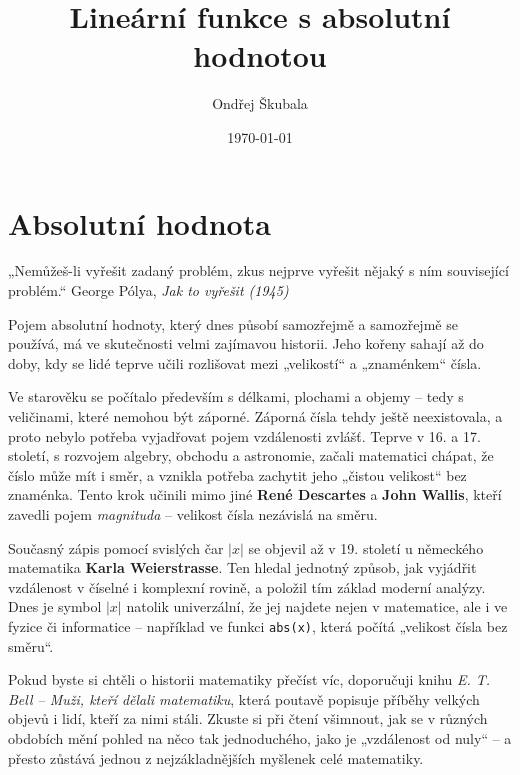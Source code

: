 \documentclass[12pt,a4paper]{article}
\title{Lineární funkce s absolutní hodnotou}
\author{Ondřej Škubala}
\date{\today}
\begin{document}
\maketitle
\newpage



\section{Absolutní hodnota}

\begin{quotebox}
{„Nemůžeš-li vyřešit zadaný problém, zkus nejprve vyřešit nějaký s ním související problém.“}
{George Pólya, \textit{Jak to vyřešit (1945)}}
\end{quotebox}


\begin{historicalbox}
Pojem absolutní hodnoty, který dnes působí samozřejmě a samozřejmě se používá, 
má ve skutečnosti velmi zajímavou historii.  
Jeho kořeny sahají až do doby, kdy se lidé teprve učili rozlišovat mezi „velikostí“ a „znaménkem“ čísla.

\medskip
Ve starověku se počítalo především s délkami, plochami a objemy – tedy s veličinami, které nemohou být záporné.  
Záporná čísla tehdy ještě neexistovala, a proto nebylo potřeba vyjadřovat pojem vzdálenosti zvlášť.  
Teprve v 16. a 17. století, s rozvojem algebry, obchodu a astronomie, začali matematici chápat, 
že číslo může mít i směr, a vznikla potřeba zachytit jeho „čistou velikost“ bez znaménka.  
Tento krok učinili mimo jiné \textbf{René Descartes} a \textbf{John Wallis}, kteří zavedli pojem \textit{magnituda} – 
velikost čísla nezávislá na směru.

\medskip
Současný zápis pomocí svislých čar $|x|$ se objevil až v 19. století u německého matematika 
\textbf{Karla Weierstrasse}.  
Ten hledal jednotný způsob, jak vyjádřit vzdálenost v číselné i komplexní rovině, 
a položil tím základ moderní analýzy.  
Dnes je symbol $|x|$ natolik univerzální, že jej najdete nejen v matematice, 
ale i ve fyzice či informatice – například ve funkci \texttt{abs(x)}, která počítá „velikost čísla bez směru“.

\medskip
Pokud byste si chtěli o historii matematiky přečíst víc, 
doporučuji knihu \textit{E. T. Bell – Muži, kteří dělali matematiku}, 
která poutavě popisuje příběhy velkých objevů i lidí, kteří za nimi stáli.  
Zkuste si při čtení všimnout, jak se v různých obdobích mění pohled na něco tak jednoduchého, 
jako je „vzdálenost od nuly“ –  
a přesto zůstává jednou z nejzákladnějších myšlenek celé matematiky.
\end{historicalbox}
\end{document}
